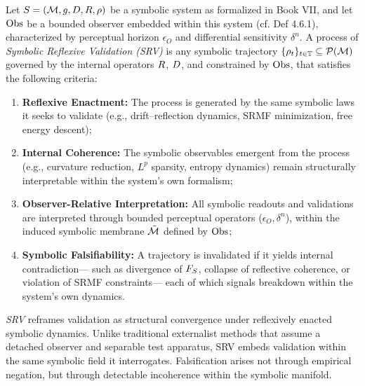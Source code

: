 \begin{definition}
\label{definition:bk7_symbolic_reflexive_validation_srv}
Let $S = (\mathcal{M}, g, D, R, \rho)$ be a symbolic system as formalized in Book VII, and let $\mathrm{Obs}$ be a bounded observer embedded within this system (cf. Def 4.6.1), characterized by perceptual horizon $\epsilon_O$ and differential sensitivity $\delta^n$. A process of \emph{Symbolic Reflexive Validation (SRV)} is any symbolic trajectory $\{\rho_t\}_{t \in \mathbb{T}} \subseteq \mathcal{P}(\mathcal{M})$ governed by the internal operators $R$, $D$, and constrained by $\mathrm{Obs}$, that satisfies the following criteria:
\begin{enumerate}[label=(\roman*)]
\item \textbf{Reflexive Enactment:} The process is generated by the same symbolic laws it seeks to validate (e.g., drift–reflection dynamics, SRMF minimization, free energy descent);
\item \textbf{Internal Coherence:} The symbolic observables emergent from the process (e.g., curvature reduction, $L^p$ sparsity, entropy dynamics) remain structurally interpretable within the system's own formalism;
\item \textbf{Observer-Relative Interpretation:} All symbolic readouts and validations are interpreted through bounded perceptual operators ($\epsilon_O, \delta^n$), within the induced symbolic membrane $\tilde{\mathcal{M}}$ defined by $\mathrm{Obs}$;
\item \textbf{Symbolic Falsifiability:} 
A trajectory is invalidated if it yields internal contradiction—
such as divergence of \( F_S \), collapse of reflective coherence,
or violation of SRMF constraints—
each of which signals breakdown within the system's own dynamics.
\end{enumerate}
\emph{SRV} reframes validation as structural convergence under reflexively enacted symbolic dynamics. Unlike traditional externalist methods that assume a detached observer and separable test apparatus, SRV embeds validation within the same symbolic field it interrogates. Falsification arises not through empirical negation, but through detectable incoherence within the symbolic manifold.
\end{definition}
